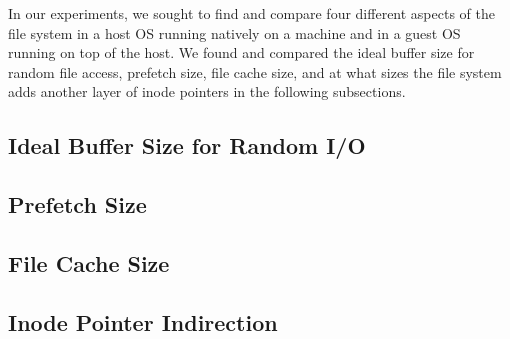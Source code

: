 In our experiments, we sought to find and compare four different aspects of the 
file system in a host OS running natively on a machine and in a guest OS running
on top of the host. We found and compared the ideal buffer size for random file 
access, prefetch size, file cache size, and at what sizes the file system adds 
another layer of inode pointers in the following subsections.

\subsection{Ideal Buffer Size for Random I/O}


\subsection{Prefetch Size}


\subsection{File Cache Size}


\subsection{Inode Pointer Indirection}

